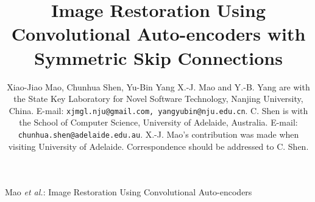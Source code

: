 \documentclass[10pt,journal,compsoc]{IEEEtran}
\begin{document}
\title
{
%
    Image Restoration Using  Convolutional Auto-encoders with Symmetric Skip Connections
}


\author
{
	Xiao-Jiao Mao, Chunhua Shen, Yu-Bin Yang
	\IEEEcompsocitemizethanks
	{
		\IEEEcompsocthanksitem
        X.-J. Mao and Y.-B. Yang are with the State Key Laboratory
		for Novel Software Technology, Nanjing University, China.
        E-mail: {\tt xjmgl.nju@gmail.com, yangyubin@nju.edu.cn}.
		\IEEEcompsocthanksitem
        C. Shen is with the School of Computer Science,
		University of Adelaide, Australia.
        E-mail: {\tt chunhua.shen@adelaide.edu.au}.
        \IEEEcompsocthanksitem
        X.-J. Mao's contribution was made when visiting University of Adelaide.
        Correspondence should be addressed to C. Shen.
	}
}



%
%
{Mao \MakeLowercase{\textit{et al.}}: Image Restoration Using  Convolutional Auto-encoders}
\end{document}
